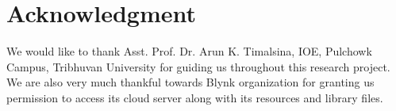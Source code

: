 \documentclass[journal,twoside]{IEEEtran}
\begin{document}

%



\section*{Acknowledgment}

We would like to thank Asst. Prof. Dr. Arun K. Timalsina,
IOE, Pulchowk Campus, Tribhuvan University for guiding us
throughout this research project. We are also very much
thankful towards Blynk organization for granting us permission
to access its cloud server along with its resources and library
files.


\ifCLASSOPTIONcaptionsoff
  \newpage
\fi



\end{document}
